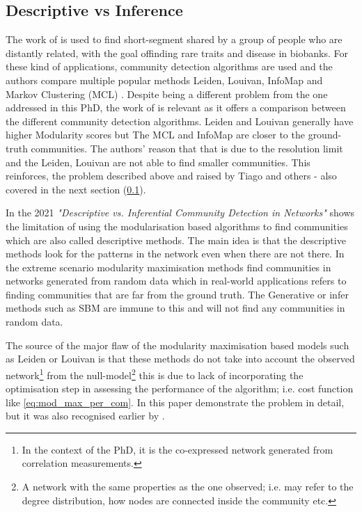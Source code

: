 \subsection{Descriptive vs Inference} \label{s:lit:descriptive_inference}

The work of \citet{Shemirani2023-ww} is used to find short-segment shared by a group of people who are distantly related, with the goal offinding rare traits and disease in biobanks. For these kind of applications, community detection algorithms are used and the authors compare multiple popular methods Leiden, Louivan, InfoMap \citet{Rosvall2008-kw} and Markov Clustering (MCL) \citet{Van_Dongen2008-yj}. Despite being a different problem from the one addressed in this PhD, the work of \citet{Shemirani2023-ww} is relevant as it offers a comparison between the different community detection algorithms. Leiden and Louivan generally have higher Modularity scores but The MCL and InfoMap are closer to the ground-truth communities. The authors' reason that that is due to the resolution limit and the Leiden, Louivan are not able to find smaller communities. This reinforces, the problem described above and raised by Tiago \citet{Peixoto2021-jx} and others \cite{Fortunato2007-gh, Traag2019-ne} - also covered in the next section (\cref{s:lit:descriptive_inference}).

In the 2021 \textit{"Descriptive vs. Inferential Community Detection in Networks"} \citet{Peixoto2021-jx} shows the limitation of using the modularisation based algorithms to find communities which are also called descriptive methods. The main idea is that the descriptive methods look for the patterns in the network even when there are not there. In the extreme scenario modularity maximisation methods find communities in networks generated from random data which in real-world applications refers to finding communities that are far from the ground truth. The  Generative or infer methods such as SBM are immune to this and will not find any communities in random data.

The source of the major flaw of the modularity maximisation based models such as Leiden or Louivan is that these methods do not take into account the observed network\footnote{In the context of the PhD, it is the co-expressed network generated from correlation measurements.} from the null-model\footnote{A network with the same properties as the one observed; i.e. may refer to the degree distribution, how nodes are connected inside the community etc.} this is due to lack of incorporating the optimisation step in assessing the performance of the algorithm; i.e. cost function like \cref{eq:mod_max_per_com}. In this paper \citet{Peixoto2021-jx} demonstrate the problem in detail, but it was also recognised earlier by \citet{Guimera2004-gv}.

